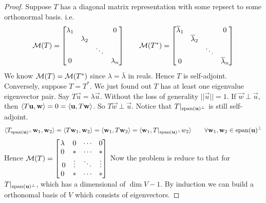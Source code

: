 \begin{proof}
	Suppose $T$ has a diagonal matrix representation with some repsect to some orthonormal basis. i.e. 
	\[ \mathcal M(T) = \begin{bmatrix}
		\lambda_1 & & & 0 \\
		& \lambda_2 \\
		& & \ddots \\
		0& & & \lambda_n 
	\end{bmatrix}\qquad \mathcal M(T^*) = \begin{bmatrix}
		\overline \lambda_1 & & & 0 \\
		& \overline \lambda_2 \\
		& & \ddots \\
		0& & & \overline \lambda_n 
	\end{bmatrix}\]
	We know $\mathcal M(T) = \mathcal M(T^*)$ since $\lambda = \bar \lambda$ in reals. Hence $T$ is self-adjoint.
	\noindent
	Conversely, suppose $T = T^*$. We just found out $T$ has at least one eigenvalue eigenvector pair. Say $T\vec u = \lambda \vec u$. Without the loss of generality $||\vec u|| = 1$. If $\vec w \perp \vec u$, then $\langle T\mathbf u, \mathbf w \rangle = 0 = \langle \mathbf u, T\mathbf w \rangle$. So $T\vec w \perp \vec u$. Notice that $T\vert_{\text{span}(\mathbf u)^\perp}$ is still self-adjoint. 
	\[ \langle T_{\text{span}(\mathbf u)^\perp} \mathbf w_1, \mathbf w_2 \rangle = \langle T \mathbf w_1, \mathbf w_2 \rangle = \langle \mathbf w_1, T\mathbf w_2\rangle = \langle \mathbf w_1, T\vert_{\text{span}(\mathbf u)^\perp} w_2 \rangle \qquad \forall \mathbf w_1, \mathbf w_2 \in \text{span}(\mathbf u)^\perp\]
	Hence $\mathcal M(T) = \begin{bmatrix}
		\lambda & 0 & \cdots & 0 \\
		0 & \ast & \cdots & \ast \\\
		0 & \vdots & \ddots & \vdots \\
		0 & \ast & \cdots & \ast 
	\end{bmatrix}$ Now the problem is reduce to that for $T\vert_{\text{span}(\mathbf u)^\perp}$, which has a dimensional of $\dim V - 1$. By induction we can build a orthonomal basis of $V$ which consists of eigenvectors.
\end{proof}
